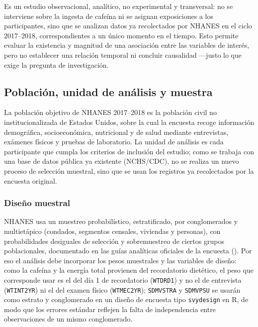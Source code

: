 \documentclass[
  spanish,
  12pt,
]{article}
\begin{document}
Es un estudio observacional, analítico, no experimental y transversal:
no se interviene sobre la ingesta de cafeína ni se asignan exposiciones
a los participantes, sino que se analizan datos ya recolectados por
NHANES en el ciclo 2017--2018, correspondientes a un único momento en el
tiempo. Esto permite evaluar la existencia y magnitud de una asociación
entre las variables de interés, pero no establecer una relación
temporal ni concluir causalidad ---justo lo que exige la pregunta de
investigación.

\subsection{Población, unidad de análisis y muestra}\label{poblaciuxf3n-unidad-de-anuxe1lisis-y-muestra}

La población objetivo de NHANES 2017--2018 es la población civil no
institucionalizada de Estados Unidos, sobre la cual la encuesta recoge
información demográfica, socioeconómica, nutricional y de salud
mediante entrevistas, exámenes físicos y pruebas de laboratorio. La
unidad de análisis es cada participante que cumpla los criterios de
inclusión del estudio; como se trabaja con una base de datos pública ya
existente (NCHS/CDC), no se realiza un nuevo proceso de selección
muestral, sino que se usan los registros ya recolectados por la
encuesta original.

\subsubsection{Diseño muestral}\label{diseuxf1o-muestral}

NHANES usa un muestreo probabilístico, estratificado, por
conglomerados y multietápico (condados, segmentos censales, viviendas y
personas), con probabilidades desiguales de selección y sobremuestreo
de ciertos grupos poblacionales, documentado en las guías analíticas
oficiales de la encuesta (). Por eso el análisis debe
incorporar los pesos muestrales y las variables de diseño: como la
cafeína y la energía total provienen del recordatorio dietético, el
peso que corresponde usar es el del día 1 de recordatorio (\texttt{WTDRD1}) y
no el de entrevista (\texttt{WTINT2YR}) ni el del examen físico (\texttt{WTMEC2YR});
\texttt{SDMVSTRA} y \texttt{SDMVPSU} se usarán como estrato y conglomerado en un
diseño de encuesta tipo \texttt{svydesign} en R, de modo que los errores
estándar reflejen la falta de independencia entre observaciones de un
mismo conglomerado.
\end{document}
